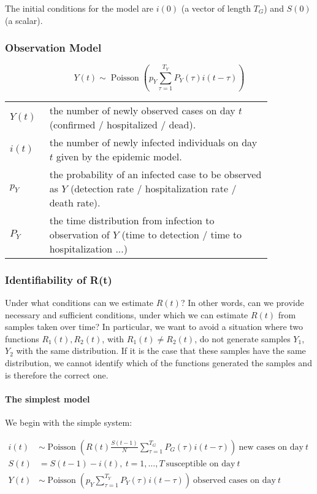 The initial conditions for the model are $i(0)$ (a vector of length $T_G$) and $S(0)$ (a scalar).

\subsubsection{Observation Model}

\begin{equation}
    Y(t) \sim \operatorname { Poisson }\left(p_{Y} \sum_{\tau=1}^{T_{Y}} P_{Y}(\tau) i(t-\tau)\right)
\end{equation}

\begin{tabular}{p{0.1\linewidth}p{0.75\linewidth}}
    $Y(t)$ & the number of newly observed cases on day $t$ (confirmed / hospitalized / dead). \\
    $i(t)$ & the number of newly infected individuals on day $t$ given by the epidemic model. \\
    $p_Y$ & the probability of an infected case to be observed as $Y$ (detection rate / hospitalization rate / death rate). \\
    $P_Y$ & the time distribution from infection to observation of $Y$ (time to detection / time to hospitalization ...) \\
\end{tabular}

\subsubsection{Identifiability of R(t)}

Under what conditions can we estimate $R(t)$?
In other words,
can we provide necessary and sufficient conditions,
under which we can estimate $R(t)$ from samples taken over time?
In particular,
we want to avoid a situation where two functions $R_1(t), R_2(t)$,
with $R_1(t) \neq R_2(t)$,
do not generate samples $Y_1$, $Y_2$ with the same distribution.
If it is the case that these samples have the same distribution,
we cannot identify which of the functions generated the samples
and is therefore the correct one.

\paragraph{The simplest model}

We begin with the simple system:

\begin{align}
    i(t) & \sim  \operatorname{Poisson} \left( R(t) \frac{S(t-1)}{N} \sum\limits_{\tau=1}^{T_G} {P_G(\tau)i(t-\tau)} \right) ~\text{new cases on day} ~ t & \\
    S(t) & = S(t - 1) - i(t), ~t=1,\ldots,T ~  \text{susceptible on day} ~ t & \\
    Y(t) & \sim \operatorname { Poisson }\left(p_{Y} \sum_{\tau=1}^{T_{Y}} P_{Y}(\tau) i(t-\tau)\right) ~ \text{observed cases on day} ~ t &
\end{align}

